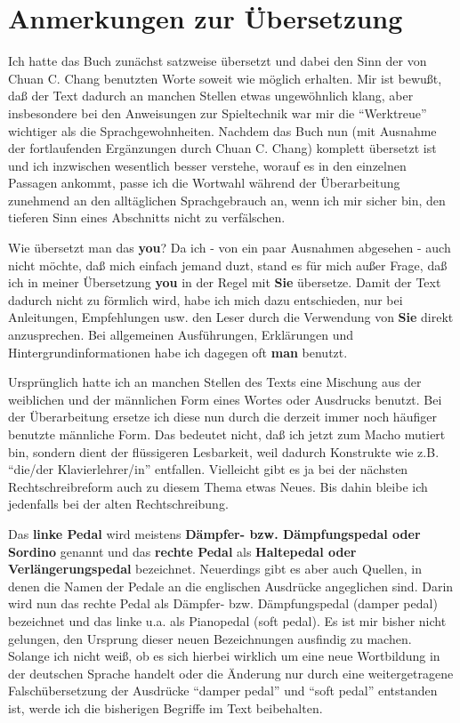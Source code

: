 
\chapter{Anmerkungen zur Übersetzung}
\label{ueberset}

Ich hatte das Buch zunächst satzweise übersetzt und dabei den Sinn der von Chuan C. Chang benutzten Worte soweit wie möglich erhalten.
Mir ist bewußt, daß der Text dadurch an manchen Stellen etwas ungewöhnlich klang, aber insbesondere bei den Anweisungen zur Spieltechnik war mir die \enquote{Werktreue} wichtiger als die Sprachgewohnheiten.
Nachdem das Buch nun (mit Ausnahme der fortlaufenden Ergänzungen durch Chuan C. Chang) komplett übersetzt ist und ich inzwischen wesentlich besser verstehe, worauf es in den einzelnen Passagen ankommt, passe ich die Wortwahl während der Überarbeitung zunehmend an den alltäglichen Sprachgebrauch an, wenn ich mir sicher bin, den tieferen Sinn eines Abschnitts nicht zu verfälschen.

Wie übersetzt man das \textbf{you}?
 Da ich - von ein paar Ausnahmen abgesehen - auch nicht möchte, daß mich einfach jemand duzt, stand es für mich außer Frage, daß ich in meiner Übersetzung \textbf{you} in der Regel mit \textbf{Sie} übersetze.
Damit der Text dadurch nicht zu förmlich wird, habe ich mich dazu entschieden, nur bei Anleitungen, Empfehlungen usw.
den Leser durch die Verwendung von \textbf{Sie} direkt anzusprechen.
Bei allgemeinen Ausführungen, Erklärungen und Hintergrundinformationen habe ich dagegen oft \textbf{man} benutzt.


Ursprünglich hatte ich an manchen Stellen des Texts eine Mischung aus der weiblichen und der männlichen Form eines Wortes oder Ausdrucks benutzt.
Bei der Überarbeitung ersetze ich diese nun durch die derzeit immer noch häufiger benutzte männliche Form.
Das bedeutet nicht, daß ich jetzt zum Macho mutiert bin, sondern dient der flüssigeren Lesbarkeit, weil dadurch Konstrukte wie z.B. \enquote{die/der Klavierlehrer/in} entfallen.
Vielleicht gibt es ja bei der nächsten Rechtschreibreform auch zu diesem Thema etwas Neues.
Bis dahin bleibe ich jedenfalls bei der alten Rechtschreibung.


\label{Pedale}

Das \textbf{linke Pedal} wird meistens \textbf{Dämpfer- bzw. Dämpfungspedal oder Sordino} genannt und das \textbf{rechte Pedal} als \textbf{Haltepedal oder Verlängerungspedal} bezeichnet.
Neuerdings gibt es aber auch Quellen, in denen die Namen der Pedale an die englischen Ausdrücke angeglichen sind.
Darin wird nun das rechte Pedal als Dämpfer- bzw. Dämpfungspedal (damper pedal) bezeichnet und das linke u.a. als Pianopedal (soft pedal).
Es ist mir bisher nicht gelungen, den Ursprung dieser neuen Bezeichnungen ausfindig zu machen.
Solange ich nicht weiß, ob es sich hierbei wirklich um eine neue Wortbildung in der deutschen Sprache handelt oder die Änderung nur durch eine weitergetragene Falschübersetzung der Ausdrücke \enquote{damper pedal} und \enquote{soft pedal} entstanden ist, werde ich die bisherigen Begriffe im Text beibehalten.

